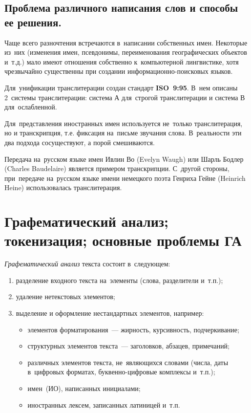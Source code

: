 \documentclass[12pt]{article}
\theoremstyle{definition}
\theoremstyle{remark}
\numberwithin{equation}{section}
\begin{document}
\subsection{Проблема различного написания слов и способы ее решения.}
Чаще всего разночтения встречаются в~написании собственных имен. Некоторые
из~них (изменения имен, псевдонимы, переименования географических объектов и~т.д.)
мало имеют отношения собственно к~компьютерной лингвистике, хотя чрезвычайно
существенны при создании информационно-поисковых языков.

Для~унификации транслитерации создан стандарт \textbf{ISO~9:95}. В~нем
описаны 2~системы транслитерации: система А для~строгой транслитерации
и система В для~ослабленной.

Для~представления иностранных имен используется не~только транслитерация,
но и транскрипция, т.е. фиксация на~письме звучания слова. В~реальности
эти два подхода сосуществуют, а порой смешиваются.

Передача на~русском языке имен Ивлин Во (Evelyn Waugh) или Шарль Бодлер
(Charles Baudelaire) является примером транскрипции. С~другой стороны,
при~передаче на~русском языке имени немецкого поэта Генриха Гейне (Heinrich
Heine) использовалась транслитерация.

\section{Графематический анализ; токенизация; основные проблемы ГА}
\textsl{Графематический анализ} текста состоит в~следующем:
\begin{enumerate}
    \item разделение входного текста на~элементы (слова,
    разделители и~т.п.);
    \item удаление нетекстовых элементов;
    \item выделение и оформление нестандартных элементов, например:
    \begin{itemize}
        \item элементов форматирования~--- жирность, курсивность,
        подчеркивание;
        \item структурных элементов текста~--- заголовков, абзацев,
        примечаний;
        \item различных элементов текста, не~являющихся словами
        (числа, даты в~цифровых форматах, буквенно-цифровые комплексы
        и~т.п.);
        \item имен~(ИО), написанных инициалами;
        \item иностранных лексем, записанных латиницей и~т.п.
    \end{itemize}
\end{enumerate}
\end{document}
